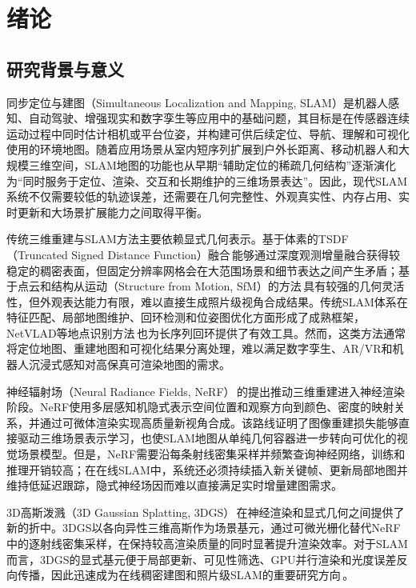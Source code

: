 \chapter{绪论}

\section{研究背景与意义}

同步定位与建图（Simultaneous Localization and Mapping, SLAM）是机器人感知、自动驾驶、增强现实和数字孪生等应用中的基础问题，其目标是在传感器连续运动过程中同时估计相机或平台位姿，并构建可供后续定位、导航、理解和可视化使用的环境地图。随着应用场景从室内短序列扩展到户外长距离、移动机器人和大规模三维空间，SLAM地图的功能也从早期“辅助定位的稀疏几何结构”逐渐演化为“同时服务于定位、渲染、交互和长期维护的三维场景表达”。因此，现代SLAM系统不仅需要较低的轨迹误差，还需要在几何完整性、外观真实性、内存占用、实时更新和大场景扩展能力之间取得平衡。

传统三维重建与SLAM方法主要依赖显式几何表示。基于体素的TSDF（Truncated Signed Distance Function）融合\,\cite{curless1996volumetric}能够通过深度观测增量融合获得较稳定的稠密表面，但固定分辨率网格会在大范围场景和细节表达之间产生矛盾；基于点云和结构从运动（Structure from Motion, SfM）的方法\,\cite{snavely2006photo}具有较强的几何灵活性，但外观表达能力有限，难以直接生成照片级视角合成结果。传统SLAM体系在特征匹配、局部地图维护、回环检测和位姿图优化方面形成了成熟框架，NetVLAD等地点识别方法\,\cite{arandjelovic2016netvlad}也为长序列回环提供了有效工具。然而，这类方法通常将定位地图、重建地图和可视化结果分离处理，难以满足数字孪生、AR/VR和机器人沉浸式感知对高保真可渲染地图的需求。

神经辐射场（Neural Radiance Fields, NeRF）\,\cite{mildenhall2020nerf}的提出推动三维重建进入神经渲染阶段。NeRF使用多层感知机隐式表示空间位置和观察方向到颜色、密度的映射关系，并通过可微体渲染实现高质量新视角合成。该路线证明了图像重建损失能够直接驱动三维场景表示学习，也使SLAM地图从单纯几何容器进一步转向可优化的视觉场景模型。但是，NeRF需要沿每条射线密集采样并频繁查询神经网络，训练和推理开销较高；在在线SLAM中，系统还必须持续插入新关键帧、更新局部地图并维持低延迟跟踪，隐式神经场因而难以直接满足实时增量建图需求。

3D高斯泼溅（3D Gaussian Splatting, 3DGS）\,\cite{kerbl20233dgaussians}在神经渲染和显式几何之间提供了新的折中。3DGS以各向异性三维高斯作为场景基元，通过可微光栅化替代NeRF中的逐射线密集采样，在保持较高渲染质量的同时显著提升渲染效率。对于SLAM而言，3DGS的显式基元便于局部更新、可见性筛选、GPU并行渲染和光度误差反向传播，因此迅速成为在线稠密建图和照片级SLAM的重要研究方向\,\cite{tosi2025nerf3dgs_slam,wang2026nextgen_slam,hadero2025beyond}。

